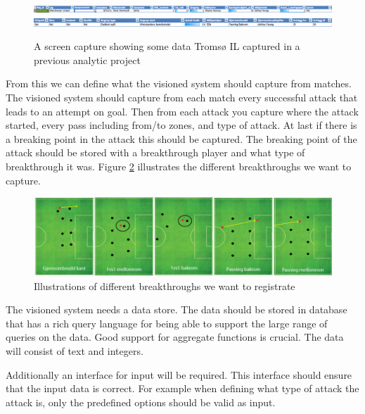 \begin{figure}[ht!]
\centering
\includegraphics[width=1\textwidth]{images/general/prev_domain_model2.png}
\includegraphics[width=1\textwidth]{images/general/prev_domain_model1.png}
\caption{A screen capture showing some data Tromsø IL captured in a previous analytic project}
\label{fig:prevdomainmodel}
\end{figure}

From this we can define what the visioned system should capture from matches. The visioned system should capture from each match every successful attack that leads to an attempt on goal. Then from each attack you capture where the attack started, every pass including from/to zones, and type of attack. At last if there is a breaking point in the attack this should be captured. The breaking point of the attack should be stored with a breakthrough player and what type of breakthrough it was. Figure \ref{fig:different_break} illustrates the different breakthroughs we want to capture.

\begin{figure}[ht!]
\centering
\includegraphics[width=1\textwidth]{images/general/different_breakthroughs.png}
\caption{Illustrations of different breakthroughs we want to registrate}
\label{fig:different_break}
\end{figure}

The visioned system needs a data store. The data should be stored in database that has a rich query language for being able to support the large range of queries on the data. Good support for aggregate functions is crucial. The data will consist of text and integers.

Additionally an interface for input will be required. This interface should ensure that the input data is correct. For example when defining what type of attack the attack is, only the predefined options should be valid as input. 

